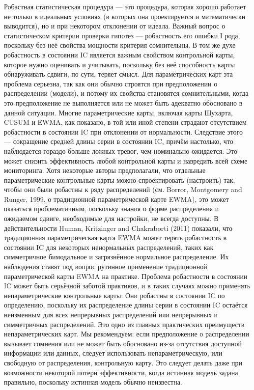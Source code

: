 Робастная статистическая процедура — это процедура, которая хорошо работает не только в идеальных условиях (в которых она проектируется и математически выводится), но и при некотором отклонении от идеала. Важный вопрос о статистическом критерии проверки гипотез — робастность его ошибки I рода, поскольку без неё свойства мощности критерия сомнительны. В том же духе робастность в состоянии IC является важным свойством контрольной карты, которое нужно оценивать и учитывать, поскольку без неё способность карты обнаруживать сдвиги, по сути, теряет смысл. Для параметрических карт эта проблема серьезна, так как они обычно строятся при предположении о распределении (модели), и потому их свойства становятся сомнительными, когда это предположение не выполняется или не может быть адекватно обосновано в данной ситуации. Многие параметрические карты, включая карты Шухарта, CUSUM и EWMA, как показано, в той или иной степени страдают отсутствием робастности в состоянии IC при отклонении от нормальности. Следствие этого — сокращение средней длины серии в состоянии IC, причём настолько, что наблюдается гораздо больше ложных тревог, чем номинально ожидается. Это может снизить эффективность любой контрольной карты и навредить всей схеме мониторинга. Хотя некоторые авторы предполагали, что отдельные параметрические контрольные карты можно спроектировать (настроить) так, чтобы они были робастны к ряду распределений (см. Borror, Montgomery and Runger, 1999, о традиционной параметрической карте EWMA), это может оказаться проблематичным, поскольку знания о форме распределения и ожидаемом сдвиге, необходимые для настройки, не всегда доступны. В действительности Human, Kritzinger and Chakraborti (2011) показали, что традиционная параметрическая карта EWMA может терять робастность в состоянии IC для некоторых ненормальных распределений, таких как симметричное бимодальное и загрязнённое нормальное распределение. Их наблюдения ставят под вопрос рутинное применение традиционной параметрической карты EWMA на практике. Проблема робастности в состоянии IC может быть серьёзной заботой практиков, и в таких случаях можно применять непараметрические контрольные карты. Они робастны в состоянии IC по определению, поскольку их распределение длины серии в состоянии IC остаётся неизменным для всех непрерывных распределений или непрерывных и симметричных распределений. Это одно из главных практических преимуществ непараметрических карт. Мы рекомендуем: если предположение о распределении вызывает сомнения или не может быть обосновано из-за отсутствия доступной информации или данных, следует использовать непараметрическую, или свободную от распределения, контрольную карту. Это следует делать даже при возможности некоторой потери эффективности, когда истинная модель задана правильно, поскольку истинная модель обычно неизвестна.

